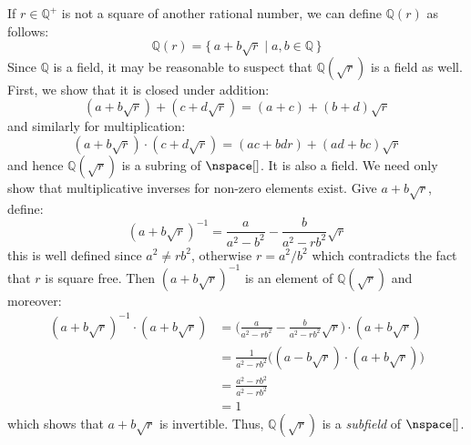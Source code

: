 \documentclass{article}                                                        %
\begin{document}
        \begin{example}
            If $r\in\mathbb{Q}^{+}$ is not a square of another rational number,
            we can define $\mathbb{Q}(r)$ as follows:
            \begin{equation}
                \mathbb{Q}(r)=\{\,a+b\sqrt{r}\;|\;a,b\in\mathbb{Q}\,\}
            \end{equation}
            Since $\mathbb{Q}$ is a field, it may be reasonable to suspect that
            $\mathbb{Q}(\sqrt{r})$ is a field as well. First, we show that it is
            closed under addition:
            \begin{equation}
                (a+b\sqrt{r})+(c+d\sqrt{r})=(a+c)+(b+d)\sqrt{r}
            \end{equation}
            and similarly for multiplication:
            \begin{equation}
                (a+b\sqrt{r})\cdot(c+d\sqrt{r})=(ac+bdr)+(ad+bc)\sqrt{r}
            \end{equation}
            and hence $\mathbb{Q}(\sqrt{r})$ is a subring of $\nspace[]$. It is
            also a field. We need only show that multiplicative inverses for
            non-zero elements exist. Give $a+b\sqrt{r}$, define:
            \begin{equation}
                (a+b\sqrt{r})^{\minus{1}}=\frac{a}{a^{2}-b^{2}}-
                    \frac{b}{a^{2}-rb^{2}}\sqrt{r}
            \end{equation}
            this is well defined since $a^{2}\ne{r}b^{2}$, otherwise
            $r=a^{2}/b^{2}$ which contradicts the fact that $r$ is square free.
            Then $(a+b\sqrt{r})^{\minus{1}}$ is an element of
            $\mathbb{Q}(\sqrt{r})$ and moreover:
            \begin{subequations}
                \begin{align}
                    (a+b\sqrt{r})^{\minus{1}}\cdot(a+b\sqrt{r})
                    &=\Big(\frac{a}{a^{2}-rb^{2}}-
                        \frac{b}{a^{2}-rb^{2}}\sqrt{r}\Big)\cdot(a+b\sqrt{r})\\
                    &=\frac{1}{a^{2}-rb^{2}}\big(
                        (a-b\sqrt{r})\cdot(a+b\sqrt{r})\big)\\
                    &=\frac{a^{2}-rb^{2}}{a^{2}-rb^{2}}\\
                    &=1
                \end{align}
            \end{subequations}
            which shows that $a+b\sqrt{r}$ is invertible. Thus,
            $\mathbb{Q}(\sqrt{r})$ is a \textit{subfield} of $\nspace[]$.
        \end{example}
\end{document}
